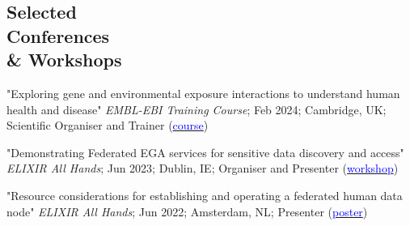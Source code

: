 \documentclass[margin,line]{res}
\begin{document}
\begin{resume}



\section{\sc Selected\\ Conferences\\ \& Workshops}


"Exploring gene and environmental exposure interactions to understand human health and disease" {\em EMBL-EBI Training Course}; Feb 2024; Cambridge, UK; Scientific Organiser and Trainer (\href{https://https://www.ebi.ac.uk/training/events/exploring-gene-and-environmental-exposure-interactions-understand-human-health-and-disease/}{\textcolor{blue}{course}})

"Demonstrating Federated EGA services for sensitive data discovery and access" {\em ELIXIR All Hands}; Jun 2023; Dublin, IE; Organiser and Presenter (\href{https://f1000research.com/slides/12-638}{\textcolor{blue}{workshop}})

"Resource considerations for establishing and operating a federated human data node" {\em ELIXIR All Hands}; Jun 2022; Amsterdam, NL; Presenter (\href{https://f1000research.com/posters/11-594}{\textcolor{blue}{poster}})






\end{resume}
\end{document}
